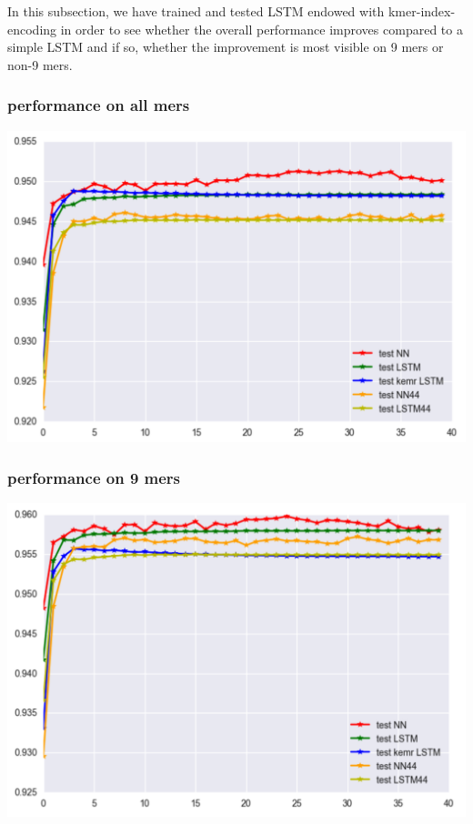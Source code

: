 \documentclass{article} %
\begin{document}
In this subsection, we have trained and tested LSTM endowed with kmer-index-encoding in order to see whether the overall performance improves compared to a simple LSTM and if so, whether the improvement is most visible on 9 mers or non-9 mers. 

\subsubsection{performance on all mers}

\includegraphics[scale = 0.3]{kmerLSTM_allmers.png}

\subsubsection{performance on 9 mers}

\includegraphics[scale = 0.3]{kmerLSTM_9mers.png}
\end{document}
